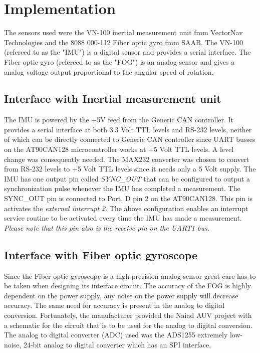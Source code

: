 
\section{Implementation}\label{sec:implementation}
The sensors used were the VN-100 inertial measurement unit from VectorNav Technologies and the 8088 000-112 Fiber optic gyro from SAAB. The VN-100 (refereed to as the "IMU") is a digital sensor and provides a serial interface. The Fiber optic gyro (refereed to as the "FOG") is an analog sensor and gives a analog voltage output proportional to the angular speed of rotation. \newline

\subsection{Interface with Inertial measurement unit}
The IMU is powered by the +5V feed from the Generic CAN controller. It provides a serial interface at both 3.3 Volt TTL levels and RS-232 levels, neither of which can be directly connected to Generic CAN controller since UART busses on the AT90CAN128 microcontroller works at +5 Volt TTL levels. A level change was consequently needed. The MAX232 converter was chosen to convert from RS-232 levels to +5 Volt TTL levels since it needs only a 5 Volt supply. \newline
The IMU has one output pin called \emph{SYNC\_OUT} that can be configured to output a synchronization pulse whenever the IMU has completed a measurement. The SYNC\_OUT pin is connected to Port, D pin 2 on the AT90CAN128. This pin is activates the \emph{external interrupt 2}. \newline
The above configuration enables an interrupt service routine to be activated every time the IMU has made a measurement.\newline 
\emph{Please note that this pin also is the receive pin on the UART1 bus.} 

\subsection{Interface with Fiber optic gyroscope}
Since the Fiber optic gyroscope is a high precision analog sensor great care has to be taken when designing its interface circuit. \newline
The accuracy of the FOG is highly dependent on the power supply, any noise on the power supply will decrease accuracy. The same need for accuracy is present in the analog to digital conversion. Fortunately, the manufacturer provided the Naiad AUV project with a schematic for the circuit that is to be used for the analog to digital conversion. The analog to digital converter (ADC) used was the ADS1255 extremely low-noise, 24-bit analog to digital converter which has an SPI interface.

